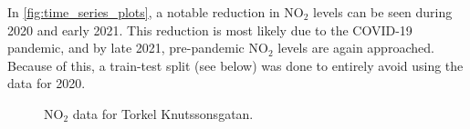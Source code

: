 In \vref{fig:time_series_plots}, a notable reduction in NO$_2$ levels can be seen during 2020 and early 2021. This reduction is most likely due to the COVID-19 pandemic, and by late 2021, pre-pandemic NO$_2$ levels are again approached.  Because of this, a train-test split (see below) was done to entirely avoid using the data for 2020.


\begin{figure}[h]
\centering
{}
\caption{NO$_2$ data for Torkel Knutssonsgatan.}
\label{fig:time_series_plots}
\end{figure}


